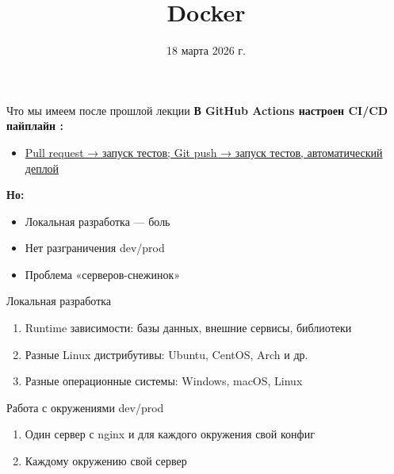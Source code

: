 \documentclass[aspectratio=169]{beamer}
\title{Docker}
\date{18 марта 2026 г.}
\begin{document}
    \maketitle

    \begin{frame}{Что мы имеем после прошлой лекции}
        \textbf{В GitHub Actions настроен CI/CD пайплайн :}

        \begin{itemize}
            \item \href{https://github.com/prafdin/devops-demo-website/tree/cicd-pullrequest-demo}{Pull request → запуск тестов; Git push → запуск тестов, автоматический деплой}
        \end{itemize}

        \textbf{Но:}

        \begin{itemize}
            \item Локальная разработка — боль
            \item Нет разграничения dev/prod
            \item Проблема «серверов-снежинок»
        \end{itemize}
    \end{frame}

    \begin{frame}{Локальная разработка}
        \begin{enumerate}
            \item Runtime зависимости: базы данных, внешние сервисы, библиотеки
            \item Разные Linux дистрибутивы: Ubuntu, CentOS, Arch и др.
            \item Разные операционные системы: Windows, macOS, Linux
        \end{enumerate}
    \end{frame}

    \begin{frame}{Работа с окружениями dev/prod}
        \begin{enumerate}
            \item Один сервер с nginx и для каждого окружения свой конфиг
            \item Каждому окружению свой сервер
        \end{enumerate}
    \end{frame}
\end{document}
